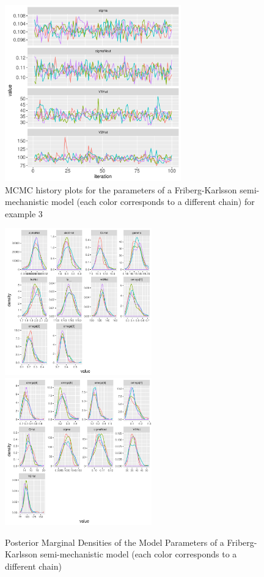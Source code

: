 \documentclass[11pt]{amsart}
\begin{document}
\begin{figure}[htbp]
\includegraphics[width=3.0in,trim=0in 0in 0 0in]{graphics/neutropenia/neutropeniaPopulation1TorstenPlots004.pdf}
\caption{{MCMC history plots for the parameters of a Friberg-Karlsson semi-mechanistic model (each color corresponds to a different chain) for example 3}}
\label{FKMCMC}
\end{figure}

\begin{figure}[htbp]
\includegraphics[width=2.5in,trim=0in 0in 0 0in]{graphics/neutropenia/neutropeniaPopulation1TorstenPlots005.pdf}
\includegraphics[width=2.5in,trim=0in 0in 0 0in]{graphics/neutropenia/neutropeniaPopulation1TorstenPlots006.pdf}
\caption{{Posterior Marginal Densities of the Model Parameters of a Friberg-Karlsson semi-mechanistic model (each color corresponds to a different chain)}}
\label{FKDens}
\end{figure}
\end{document}
